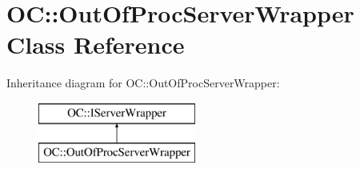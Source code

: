 \hypertarget{classOC_1_1OutOfProcServerWrapper}{}\section{O\+C\+:\+:Out\+Of\+Proc\+Server\+Wrapper Class Reference}
\label{classOC_1_1OutOfProcServerWrapper}
Inheritance diagram for O\+C\+:\+:Out\+Of\+Proc\+Server\+Wrapper\+:\begin{figure}[H]
\begin{center}
\leavevmode
\includegraphics[height=2.000000cm]{classOC_1_1OutOfProcServerWrapper}
\end{center}
\end{figure}
